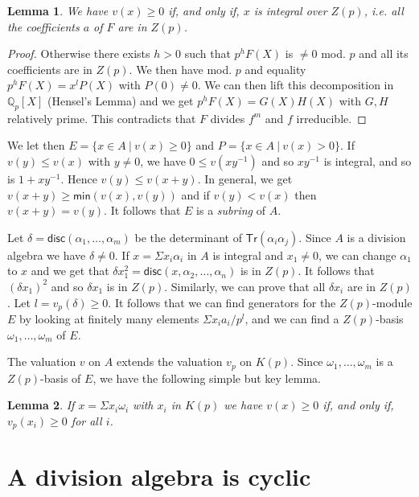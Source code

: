 \documentclass[10pt,a4paper]{article}
\newtheorem{lemma}{Lemma}[section]
\newcommand{\rats}{\mathbb{Q}}
\newcommand\disc{\mathsf{disc}}
\newcommand\Min{\mathsf{min}}
\newcommand\Tr{\mathsf{Tr}}
\begin{document}
\begin{lemma}\label{main}
We have $v(x)\geqslant 0$ if, and only if, $x$ is integral over $Z(p)$, i.e.
all the coefficients $a$ of $F$ are in $Z(p)$. 
\end{lemma}

\begin{proof}
Otherwise there exists $h>0$ such that
$p^hF(X)$ is $\neq 0$ mod. $p$ and all its coefficients are in $Z(p)$.  We then have mod. $p$
and equality $p^hF(X) = x^lP(X)$ with $P(0)\neq 0$. We can then lift this decomposition  in $\rats_p[X]$
(Hensel's Lemma) and we get $p^hF(X) = G(X)H(X)$ with $G,H$ relatively prime. This contradicts
that $F$ divides $f^m$ and $f$ irreducible.
\end{proof}

We let then $E = \{x\in A~|~v(x)\geqslant 0\}$ and $P = \{x\in A~|~v(x)>0\}$. If $v(y)\leqslant v(x)$
with $y\neq 0$, we have $0\leqslant v(xy^{-1})$ and so $xy^{-1}$ is integral, and so is $1+xy^{-1}$.
Hence $v(y)\leqslant v(x+y)$. In general, we get $v(x+y)\geqslant \Min(v(x),v(y))$ and if $v(y)<v(x)$ then
$v(x+y) = v(y)$.
It follows that $E$ is a {\em subring} of $A$.




Let $\delta = \disc(\alpha_1,\dots,\alpha_m)$ be the determinant of $\Tr(\alpha_i\alpha_j)$. Since $A$ is a division algebra we
have $\delta \neq 0$. If $x = \Sigma x_i\alpha_i$ in $A$ is integral and $x_1\neq 0$, we can change
$\alpha_1$ to $x$ and we get that $\delta x_1^2 = \disc(x,\alpha_2,\dots,\alpha_n)$ is in $Z(p)$.
It follows that $(\delta x_1)^2$ and so $\delta x_1$ is in $Z(p)$. Similarly, we can prove that all $\delta x_i$ are in $Z(p)$.
Let $l = v_p(\delta)\geqslant 0$. It follows that we can find generators for the $Z(p)$-module $E$ by looking at
finitely many elements $\Sigma x_i a_i/p^l $, and we can find a $Z(p)$-basis $\omega_1,\dots,\omega_m$ of $E$.

The valuation $v$ on $A$ extends the valuation $v_p$ on $K(p)$. Since $\omega_1,\dots,\omega_m$ is
a $Z(p)$-basis of $E$, we have the following simple but key lemma.

\begin{lemma}\label{key}
  If $x = \Sigma x_i\omega_i$ with $x_i$ in $K(p)$ we have $v(x)\geqslant 0$ if, and only if,
  $v_p(x_i)\geqslant 0$ for all $i$.
\end{lemma}

\section{A division algebra is cyclic}
\end{document}
